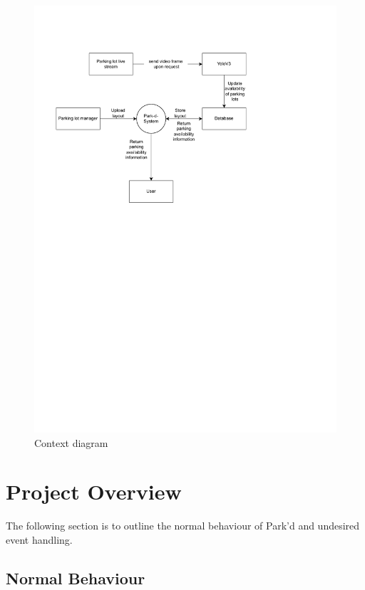 \documentclass[12pt, titlepage]{article}
\begin{document}
\begin{figure}[H]
    \begin{center}
        \caption{Context diagram}
        \includegraphics[scale=1.0]{Context_diagram.pdf}
    \end{center}
\end{figure}

\newpage

\section{Project Overview}

The following section is to outline the normal behaviour of Park'd and undesired
event handling.

\subsection{Normal Behaviour}
\end{document}
